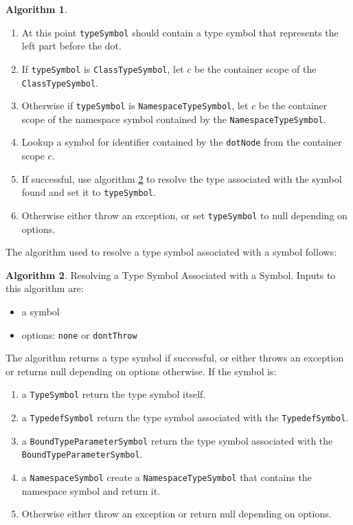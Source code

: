 \documentclass[a4paper,oneside,11pt]{book}
\theoremstyle{definition}
\newtheorem{algo}{Algorithm}[section]
\begin{document}
\begin{algo}
\begin{itemize}
\begin{enumerate}
\item
At this point \verb|typeSymbol| should contain a type symbol that represents the left part before the dot.
\item
If \verb|typeSymbol| is \verb|ClassTypeSymbol|, let $c$ be the container scope of the\\
\verb|ClassTypeSymbol|.
\item
Otherwise if \verb|typeSymbol| is \verb|NamespaceTypeSymbol|, let $c$ be the container scope of the namespace symbol contained by the \verb|NamespaceTypeSymbol|.\item
Lookup a symbol for identifier contained by the \verb|dotNode| from the container scope $c$.
\item
If successful, use algorithm \ref{resolvesymboltype} to resolve the type associated with the symbol found and set it to \verb|typeSymbol|.
\item
Otherwise either throw an exception, or set \verb|typeSymbol| to null depending on options.
\end{enumerate}
\end{itemize}
\end{algo}

The algorithm used to resolve a type symbol associated with a symbol follows:

\begin{algo}\label{resolvesymboltype} Resolving a Type Symbol Associated with a Symbol.
Inputs to this algorithm are:
\begin{itemize}
\item
a symbol
\item
options: \verb|none| or \verb|dontThrow|
\end{itemize}
The algorithm returns a type symbol if successful, or either throws an exception or returns null depending on options otherwise.
If the symbol is:
\begin{enumerate}
\item
a \verb|TypeSymbol| return the type symbol itself.
\item
a \verb|TypedefSymbol| return the type symbol associated with the \verb|TypedefSymbol|.
\item
a \verb|BoundTypeParameterSymbol| return the type symbol associated with the\\
\verb|BoundTypeParameterSymbol|.
\item
a \verb|NamespaceSymbol| create a \verb|NamespaceTypeSymbol| that contains the namespace symbol and return it.
\item
Otherwise either throw an exception or return null depending on options.
\end{enumerate}
\end{algo}
\end{document}
